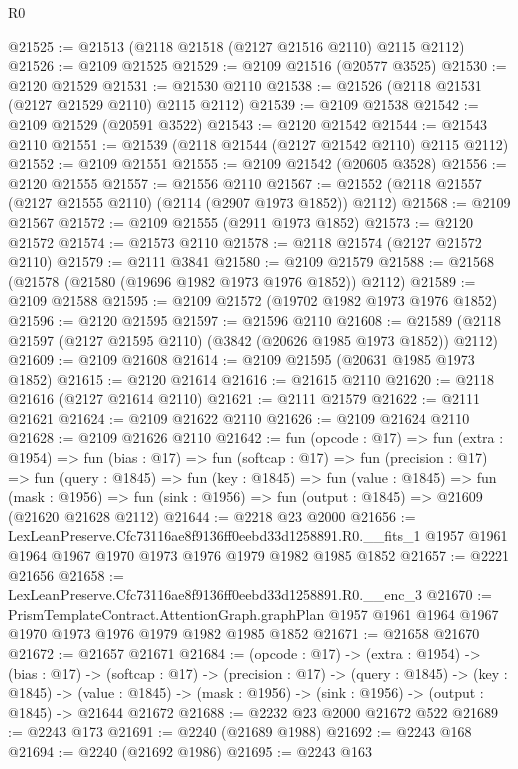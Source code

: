 \begin{lexlean}{R0}
\begin{coremodule}
@21525 := @21513 (@2118 @21518 (@2127 @21516 @2110) @2115 @2112)
@21526 := @2109 @21525
@21529 := @2109 @21516 (@20577 @3525)
@21530 := @2120 @21529
@21531 := @21530 @2110
@21538 := @21526 (@2118 @21531 (@2127 @21529 @2110) @2115 @2112)
@21539 := @2109 @21538
@21542 := @2109 @21529 (@20591 @3522)
@21543 := @2120 @21542
@21544 := @21543 @2110
@21551 := @21539 (@2118 @21544 (@2127 @21542 @2110) @2115 @2112)
@21552 := @2109 @21551
@21555 := @2109 @21542 (@20605 @3528)
@21556 := @2120 @21555
@21557 := @21556 @2110
@21567 := @21552 (@2118 @21557 (@2127 @21555 @2110) (@2114 (@2907 @1973 @1852)) @2112)
@21568 := @2109 @21567
@21572 := @2109 @21555 (@2911 @1973 @1852)
@21573 := @2120 @21572
@21574 := @21573 @2110
@21578 := @2118 @21574 (@2127 @21572 @2110)
@21579 := @2111 @3841
@21580 := @2109 @21579
@21588 := @21568 (@21578 (@21580 (@19696 @1982 @1973 @1976 @1852)) @2112)
@21589 := @2109 @21588
@21595 := @2109 @21572 (@19702 @1982 @1973 @1976 @1852)
@21596 := @2120 @21595
@21597 := @21596 @2110
@21608 := @21589 (@2118 @21597 (@2127 @21595 @2110) (@3842 (@20626 @1985 @1973 @1852)) @2112)
@21609 := @2109 @21608
@21614 := @2109 @21595 (@20631 @1985 @1973 @1852)
@21615 := @2120 @21614
@21616 := @21615 @2110
@21620 := @2118 @21616 (@2127 @21614 @2110)
@21621 := @2111 @21579
@21622 := @2111 @21621
@21624 := @2109 @21622 @2110
@21626 := @2109 @21624 @2110
@21628 := @2109 @21626 @2110
@21642 := fun (opcode : @17) =>
  fun (extra : @1954) =>
  fun (bias : @17) =>
  fun (softcap : @17) =>
  fun (precision : @17) =>
  fun (query : @1845) =>
  fun (key : @1845) =>
  fun (value : @1845) =>
  fun (mask : @1956) => fun (sink : @1956) => fun (output : @1845) => @21609 (@21620 @21628 @2112)
@21644 := @2218 @23 @2000
@21656 := LexLeanPreserve.Cfc73116ae8f9136ff0eebd33d1258891.R0.__fits_1
    @1957
    @1961
    @1964
    @1967
    @1970
    @1973
    @1976
    @1979
    @1982
    @1985
    @1852
@21657 := @2221 @21656
@21658 := LexLeanPreserve.Cfc73116ae8f9136ff0eebd33d1258891.R0.__enc_3
@21670 := PrismTemplateContract.AttentionGraph.graphPlan
    @1957
    @1961
    @1964
    @1967
    @1970
    @1973
    @1976
    @1979
    @1982
    @1985
    @1852
@21671 := @21658 @21670
@21672 := @21657 @21671
@21684 := (opcode : @17) ->
  (extra : @1954) ->
  (bias : @17) ->
  (softcap : @17) ->
  (precision : @17) ->
  (query : @1845) ->
  (key : @1845) ->
  (value : @1845) -> (mask : @1956) -> (sink : @1956) -> (output : @1845) -> @21644 @21672
@21688 := @2232 @23 @2000 @21672 @522
@21689 := @2243 @173
@21691 := @2240 (@21689 @1988)
@21692 := @2243 @168
@21694 := @2240 (@21692 @1986)
@21695 := @2243 @163

\end{coremodule}
\end{lexlean}
